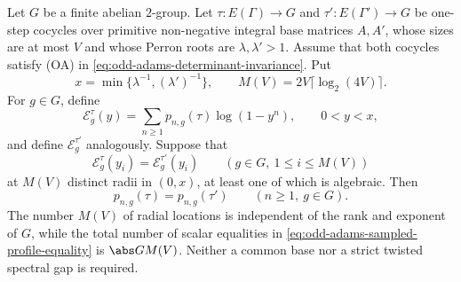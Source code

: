 \begin{theorem}
\label{thm:odd-adams-abelian-two-group-finite-sampling}
Let \(G\) be a finite abelian \(2\)-group.  Let
\(\tau:E(\Gamma)\to G\) and \(\tau':E(\Gamma')\to G\) be one-step
cocycles over primitive non-negative integral base matrices \(A,A'\), whose
sizes are at most \(V\) and whose Perron roots are
\(\lambda,\lambda'>1\).  Assume that both cocycles satisfy (OA) in
\eqref{eq:odd-adams-determinant-invariance}.  Put
\[
 x=\min\{\lambda^{-1},(\lambda')^{-1}\},\qquad
 M(V)=2V\lceil\log_2(4V)\rceil.
\]
For \(g\in G\), define
\[
 \mathcal E_g^\tau(y)
 =\sum_{n\ge1}p_{n,g}(\tau)\log(1-y^n),\qquad 0<y<x,
\]
and define \(\mathcal E_g^{\tau'}\) analogously.  Suppose that
\begin{equation}\label{eq:odd-adams-sampled-profile-equality}
 \mathcal E_g^\tau(y_i)=\mathcal E_g^{\tau'}(y_i)
 \qquad(g\in G,\ 1\le i\le M(V))
\end{equation}
at \(M(V)\) distinct radii in \((0,x)\), at least one of which is algebraic.
Then
\[
 p_{n,g}(\tau)=p_{n,g}(\tau')
 \qquad(n\ge1,\ g\in G).
\]
The number \(M(V)\) of radial locations is independent of the rank and
exponent of \(G\), while the total number of scalar equalities in
\eqref{eq:odd-adams-sampled-profile-equality} is \(\abs G M(V)\).
Neither a common base nor a strict twisted spectral gap is required.
\end{theorem}

